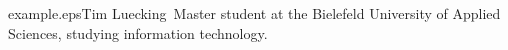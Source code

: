 %
%





%
%


\begin{authorbiography}{example.eps}{Tim Luecking}\
Master student at the Bielefeld University of Applied Sciences, studying information technology.
\end{authorbiography}


